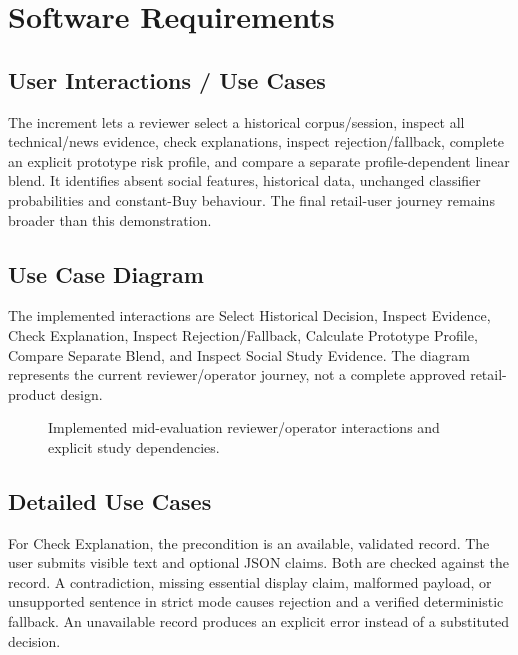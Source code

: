 \chapter{Software Requirements}
\section{User Interactions / Use Cases}
The increment lets a reviewer select a historical corpus/session, inspect all technical/news evidence, check explanations, inspect rejection/fallback, complete an explicit prototype risk profile, and compare a separate profile-dependent linear blend. It identifies absent social features, historical data, unchanged classifier probabilities and constant-Buy behaviour. The final retail-user journey remains broader than this demonstration.
\section{Use Case Diagram}
The implemented interactions are Select Historical Decision, Inspect Evidence, Check Explanation, Inspect Rejection/Fallback, Calculate Prototype Profile, Compare Separate Blend, and Inspect Social Study Evidence. The diagram represents the current reviewer/operator journey, not a complete approved retail-product design.
\begin{figure}[htbp]\centering

\caption{Implemented mid-evaluation reviewer/operator interactions and explicit study dependencies.}
\end{figure}
\section{Detailed Use Cases}
For Check Explanation, the precondition is an available, validated record. The user submits visible text and optional JSON claims. Both are checked against the record. A contradiction, missing essential display claim, malformed payload, or unsupported sentence in strict mode causes rejection and a verified deterministic fallback. An unavailable record produces an explicit error instead of a substituted decision.
